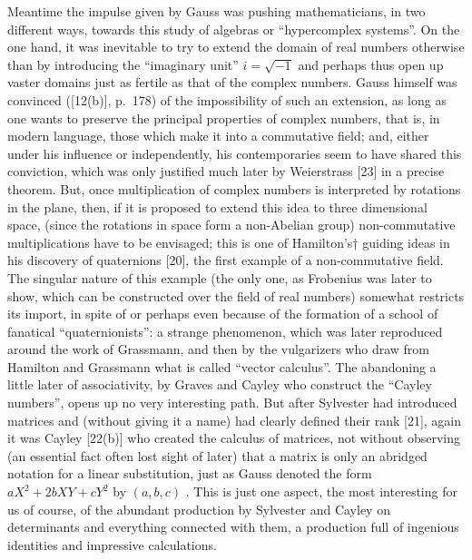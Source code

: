 Meantime the impulse given by Gauss was pushing mathematicians, in two different ways, towards this study of algebras or ``hypercomplex systems''. On the one hand, it was inevitable to try to extend the domain of real numbers otherwise than by introducing the ``imaginary unit'' \(i = \sqrt{-1}\) and perhaps thus open up vaster domains just as fertile as that of the complex numbers. Gauss himself was convinced ({[}12(b){]}, p.~178) of the impossibility of such an extension, as long as one wants to preserve the principal properties of complex numbers, that is, in modern language, those which make it into a commutative field; and, either under his influence or independently, his contemporaries seem to have shared this conviction, which was only justified much later by Weierstrass {[}23{]} in a precise theorem. But, once multiplication of complex numbers is interpreted by rotations in the plane, then, if it is proposed to extend this idea to three dimensional space, (since the rotations in space form a non-Abelian group) non-commutative multiplications have to be envisaged; this is one of Hamilton's† guiding ideas in his discovery of quaternions {[}20{]}, the first example of a non-commutative field. The singular nature of this example (the only one, as Frobenius was later to show, which can be constructed over the field of real numbers) somewhat restricts its import, in spite of or perhaps even because of the formation of a school of fanatical ``quaternionists'': a strange phenomenon, which was later reproduced around the work of Grassmann, and then by the vulgarizers who draw from Hamilton and Grassmann what is called ``vector calculus''. The abandoning a little later of associativity, by Graves and Cayley who construct the ``Cayley numbers'', opens up no very interesting path. But after Sylvester had introduced matrices and (without giving it a name) had clearly defined their rank {[}21{]}, again it was Cayley {[}22(b){]} who created the calculus of matrices, not without observing (an essential fact often lost sight of later) that a matrix is only an abridged notation for a linear substitution, just as Gauss denoted the form \(aX^{2} + 2bXY + cY^{2}\) by \((a, b, c)\) . This is just one aspect, the most interesting for us of course, of the abundant production by Sylvester and Cayley on determinants and everything connected with them, a production full of ingenious identities and impressive calculations.

